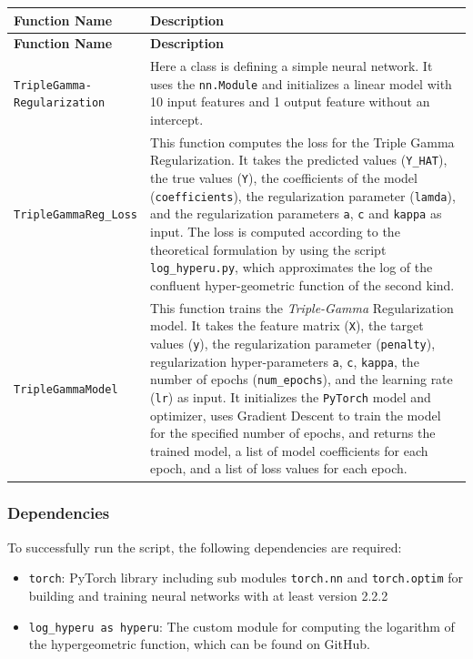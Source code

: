 \documentclass[12pt,a4paper]{article}
\begin{document}
\begin{longtable}{|p{4cm}|p{9cm}|}
\hline
\textbf{Function Name} & \textbf{Description} \\
\hline
\endfirsthead

\hline
\textbf{Function Name} & \textbf{Description} \\
\hline
\endhead

\hline
\endfoot

\hline
\endlastfoot

\makecell{\texttt{TripleGamma-}\\\texttt{Regularization}} & Here a class is defining a simple neural network. It uses the \texttt{nn.Module} and initializes a linear model with 10 input features and 1 output feature without an intercept. \\
\hline
	\texttt{TripleGammaReg\_Loss} & This function computes the loss for the Triple Gamma Regularization. It takes the predicted values (\texttt{Y\_HAT}), the true values (\texttt{Y}), the coefficients of the model (\texttt{coefficients}), the regularization parameter (\texttt{lamda}), and the regularization parameters \texttt{a}, \texttt{c} and \texttt{kappa} as input. The loss is computed according to the theoretical formulation by using the script \texttt{log\_hyperu.py}, which approximates the log of the confluent hyper-geometric function of the second kind. \\
\hline
\texttt{TripleGammaModel} & This function trains the \textit{Triple-Gamma} Regularization model. It takes the feature matrix (\texttt{X}), the target values (\texttt{y}), the regularization parameter (\texttt{penalty}), regularization hyper-parameters \texttt{a}, \texttt{c}, \texttt{kappa}, the number of epochs (\texttt{num\_epochs}), and the learning rate (\texttt{lr}) as input. It initializes the \texttt{PyTorch} model and optimizer, uses Gradient Descent to train the model for the specified number of epochs, and returns the trained model, a list of model coefficients for each epoch, and a list of loss values for each epoch.\\
\hline
\end{longtable}

\subsubsection*{Dependencies}
To successfully run the script, the following dependencies are required:
\begin{itemize}
    \item \texttt{torch}: PyTorch library including sub modules \texttt{torch.nn} and \texttt{torch.optim} for building and training neural networks with at least version 2.2.2
    \item \texttt{log\_hyperu as hyperu}: The custom module for computing the logarithm of the hypergeometric function, which can be found on GitHub.
\end{itemize}
\end{document}
